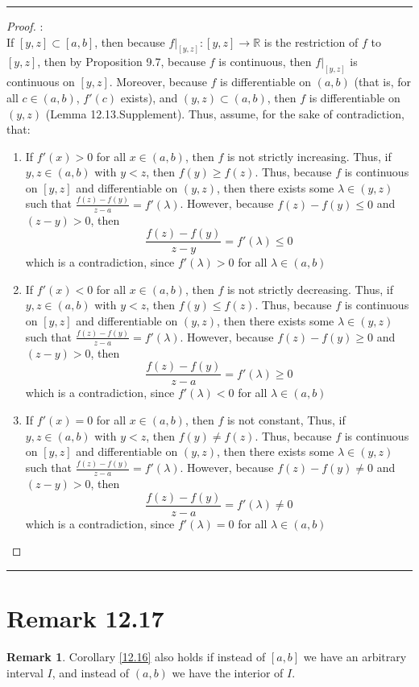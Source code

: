 \documentclass[openany, amssymb, psamsfonts]{amsart}
\newcommand{\bbR}{\mathbb{R}}
\theoremstyle{definition}
\newtheorem{rem}{Remark}[section]
\numberwithin{equation}{section}
\begin{document}
\vspace{4pt}     \hrule   \vspace{4pt} \begin{proof}:\\
If $[y,z]\subset [a,b]$, then because $f|_{[y,z]}:[y,z]\to \bbR$ is the restriction of $f$ to $[y,z]$, then by Proposition 9.7, because $f$ is continuous, then $f|_{[y,z]}$ is continuous on $[y,z]$. Moreover, because $f$ is differentiable on $(a,b)$ (that is, for all $c\in (a,b)$, $f'(c)$ exists), and $(y,z)\subset (a,b)$, then $f$ is differentiable on $(y,z)$ (Lemma 12.13.Supplement). Thus, assume, for the sake of contradiction, that: 
\begin{enumerate}
    \item If $f'(x)>0$ for all $x\in (a,b)$, then $f$ is not strictly increasing. Thus, if $y,z\in (a,b)$ with $y<z$, then $f(y)\geq f(z)$. Thus, because $f$ is continuous on $[y,z]$ and differentiable on $(y,z)$, then there exists some $\lambda \in (y,z)$ such that $\frac{f(z) - f(y)}{z-a} = f'(\lambda)$. However, because $f(z) - f(y)\leq 0$ and $(z-y)>0$, then \[\frac{f(z) - f(y)}{z-y}  = f'(\lambda)\leq 0\] which is a contradiction, since $f'(\lambda)>0$ for all $\lambda \in (a,b)$ 
    \item If $f'(x)<0$ for all $x\in (a,b)$, then $f$ is not strictly decreasing. Thus, if $y,z\in (a,b)$ with $y<z$, then $f(y)\leq f(z)$. Thus, because $f$ is continuous on $[y,z]$ and differentiable on $(y,z)$, then there exists some $\lambda \in (y,z)$ such that $\frac{f(z) - f(y)}{z-a} = f'(\lambda)$. However, because $f(z) - f(y)\geq 0$ and $(z-y)>0$, then \[\frac{f(z) - f(y)}{z-a}  = f'(\lambda)\geq 0\] which is a contradiction, since $f'(\lambda)<0$ for all $\lambda \in (a,b)$ 
    \item If $f'(x) = 0$ for all $x\in (a,b)$, then $f$ is not constant, Thus, if $y,z\in (a,b)$ with $y<z$, then $f(y)\neq f(z)$. Thus, because $f$ is continuous on $[y,z]$ and differentiable on $(y,z)$, then there exists some $\lambda \in (y,z)$ such that $\frac{f(z) - f(y)}{z-a} = f'(\lambda)$. However, because $f(z) - f(y)\neq 0$ and $(z-y)>0$, then \[\frac{f(z) - f(y)}{z-a}  = f'(\lambda)\neq 0\] which is a contradiction, since $f'(\lambda)=0$ for all $\lambda \in (a,b)$ 
\end{enumerate}
\end{proof}\vspace{4pt}     \hrule   \vspace{4pt}

\section*{Remark 12.17}
\begin{rem}\label{12.17}
	Corollary \ref{12.16} also holds if instead of $[a, b]$ we have an arbitrary interval $I$, and instead of $(a, b)$ we have the interior of $I$.\end{rem} 
\end{document}
